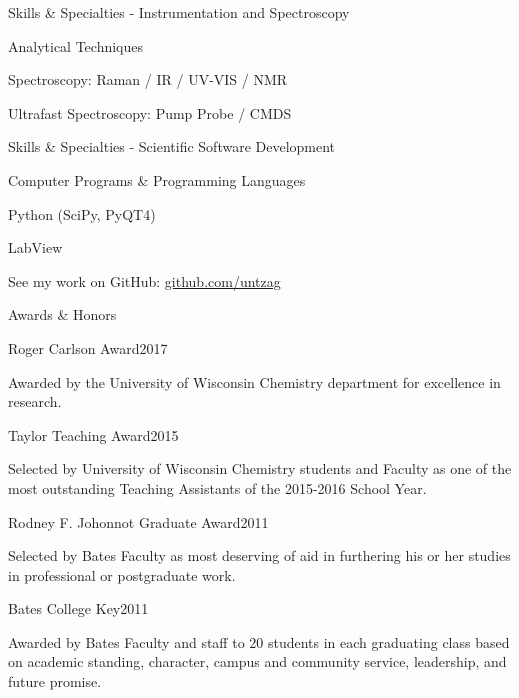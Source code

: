 \documentclass{resume}  %
\begin{document}
\begin{rSection}{Skills \& Specialties - Instrumentation and Spectroscopy}
	
\begin{rSubsection}{Analytical Techniques}{}{}{}
\item Spectroscopy: Raman / IR / UV-VIS / NMR
\item Ultrafast Spectroscopy: Pump Probe / CMDS 
\end{rSubsection}

\end{rSection}

\begin{rSection}{Skills \& Specialties - Scientific Software Development}

\begin{rSubsection}{Computer Programs \& Programming Languages}{}{}{}
\item Python (SciPy, PyQT4)
\item LabView
\item See my work on GitHub: \href{https://github.com/untzag}{github.com/untzag}
\end{rSubsection}

\end{rSection}

\begin{rSection}{Awards \& Honors}

\begin{rSubsection}{Roger Carlson Award}{2017}{}{}
	\item Awarded by the University of Wisconsin Chemistry department for excellence in research.
\end{rSubsection}

\begin{rSubsection}{Taylor Teaching Award}{2015}{}{}
\item  Selected by University of Wisconsin Chemistry students and Faculty as one of the most outstanding Teaching Assistants of the 2015-2016 School Year.
\end{rSubsection}

\begin{rSubsection}{Rodney F. Johonnot Graduate Award}{2011}{}{}
\item  Selected by Bates Faculty as most deserving of aid in furthering his or her studies in professional or postgraduate work.
\end{rSubsection}

\begin{rSubsection}{Bates College Key}{2011}{}{}
\item Awarded by Bates Faculty and staff to 20 students in each graduating class based on academic standing, character, campus and community service, leadership, and future promise.
\end{rSubsection}

\end{rSection}
\end{document}
